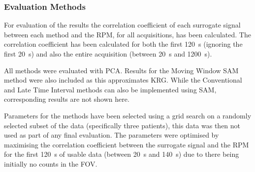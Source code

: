             \subsubsection{Evaluation Methods} \label{sec:pca_data_driven_surrogate_signal_extraction_methods_for_dynamic_pet_evaluation_evaluation_methods}
                For evaluation of the results the correlation coefficient of each surrogate signal between each method and the \gls{RPM}, for all acquisitions, has been calculated. The correlation coefficient has been calculated for both the first \SI{120}{\second} (ignoring the first \SI{20}{\second}) and also the entire acquisition (between \SI{20}{\second} and \SI{1200}{\second}).
                
                All methods were evaluated with \gls{PCA}. Results for the Moving Window \gls{SAM} method were also included as this approximates \gls{KRG}.
                While the Conventional and Late Time Interval methods can also be implemented using \gls{SAM}, corresponding results are not shown here.
        
                Parameters for the methods have been selected using a grid search on a randomly selected subset of the data (specifically three patients), this data was then not used as part of any final evaluation. The parameters were optimised by maximising the correlation coefficient between the surrogate signal and the \gls{RPM} for the first \SI{120}{\second} of usable data (between \SI{20}{\second} and \SI{140}{\second}) due to there being initially no counts in the \gls{FOV}.

